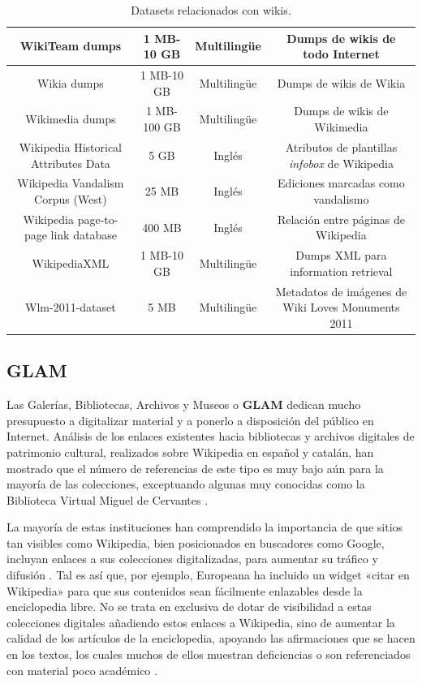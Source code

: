 \documentclass[11pt,onecolumn]{article}
\begin{document}
\begin{table}
\begin{tabular}{| c | c | c | c |}
WikiTeam dumps & 1 MB-10 GB & Multilingüe & Dumps de wikis de todo Internet \\ \hline 
Wikia dumps & 1 MB-10 GB & Multilingüe & Dumps de wikis de Wikia \\ \hline 
Wikimedia dumps & 1 MB-100 GB & Multilingüe & Dumps de wikis de Wikimedia \\ \hline 
Wikipedia Historical Attributes Data & 5 GB & Inglés & Atributos de plantillas \emph{infobox} de Wikipedia \\ \hline 
Wikipedia Vandalism Corpus (West) & 25 MB & Inglés & Ediciones marcadas como vandalismo \\ \hline 
Wikipedia page-to-page link database & 400 MB & Inglés & Relación entre páginas de Wikipedia \\ \hline 
WikipediaXML & 1 MB-10 GB & Multilingüe & Dumps XML para information retrieval \\ \hline 
Wlm-2011-dataset & 5 MB & Multilingüe & Metadatos de imágenes de Wiki Loves Monuments 2011 \\ \hline
\end{tabular}
\caption{Datasets relacionados con wikis.}
\label{tab:datasetstable}
\end{table}

\subsection{GLAM}


Las Galerías, Bibliotecas, Archivos y Museos o \textbf{GLAM} dedican mucho presupuesto a digitalizar material y a ponerlo a disposición del público en Internet. Análisis de los enlaces existentes hacia bibliotecas y archivos digitales de patrimonio cultural, realizados sobre Wikipedia en español y catalán, han mostrado que el número de referencias de este tipo es muy bajo aún para la mayoría de las colecciones, exceptuando algunas muy conocidas como la Biblioteca Virtual Miguel de Cervantes \citep{saorin2012}.

La mayoría de estas instituciones han comprendido la importancia de que sitios tan visibles como Wikipedia, bien posicionados en buscadores como Google, incluyan enlaces a sus colecciones digitalizadas, para aumentar su tráfico y difusión \citep{lally2007, elder2012}. Tal es así que, por ejemplo, Europeana ha incluido un widget «citar en Wikipedia» para que sus contenidos sean fácilmente enlazables desde la enciclopedia libre. No se trata en exclusiva de dotar de visibilidad a estas colecciones digitales añadiendo estos enlaces a Wikipedia, sino de aumentar la calidad de los artículos de la enciclopedia, apoyando las afirmaciones que se hacen en los textos, los cuales muchos de ellos muestran deficiencias o son referenciados con material poco académico \citep{nielsen2007, luyt2010}.
\end{document}

